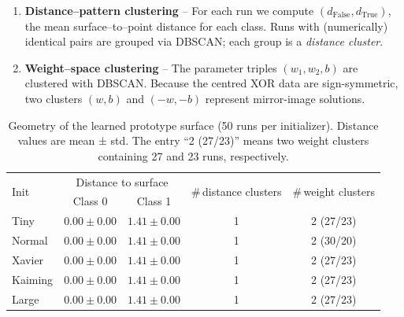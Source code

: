 \begin{enumerate}[label=(G\arabic*)]
    \item \textbf{Distance–pattern clustering} –  
          For each run we compute \((d_{\text{False}},d_{\text{True}})\),
          the mean surface–to–point distance for each class.
          Runs with (numerically) identical pairs are grouped via DBSCAN;
          each group is a \emph{distance cluster}.
    \item \textbf{Weight–space clustering} –  
          The parameter triples \((w_1,w_2,b)\) are clustered with DBSCAN.
          Because the centred XOR data are sign-symmetric, two clusters
          \((w,b)\) and \((-w,-b)\) represent mirror-image solutions.
\end{enumerate}

\begin{table}[h]
\centering
\caption{Geometry of the learned prototype surface (50 runs per
initializer).  Distance values are mean ± std.  The entry
“2 (27/23)” means two weight clusters containing 27 and 23 runs,
respectively.}
\label{tab:abs1-init-geometry}
\begin{tabular}{lcccc}
\toprule
\multirow{2}{*}{Init} &
\multicolumn{2}{c}{Distance to surface} &
\multirow{2}{*}{\#\,distance clusters} &
\multirow{2}{*}{\#\,weight clusters} \\
\cmidrule(lr){2-3}
 & Class 0 & Class 1 & & \\
\midrule
Tiny    & $0.00\pm0.00$ & $1.41\pm0.00$ & 1 & 2 (27/23) \\
Normal  & $0.00\pm0.00$ & $1.41\pm0.00$ & 1 & 2 (30/20) \\
Xavier  & $0.00\pm0.00$ & $1.41\pm0.00$ & 1 & 2 (27/23) \\
Kaiming & $0.00\pm0.00$ & $1.41\pm0.00$ & 1 & 2 (27/23) \\
Large   & $0.00\pm0.00$ & $1.41\pm0.00$ & 1 & 2 (27/23) \\
\bottomrule
\end{tabular}
\end{table}

